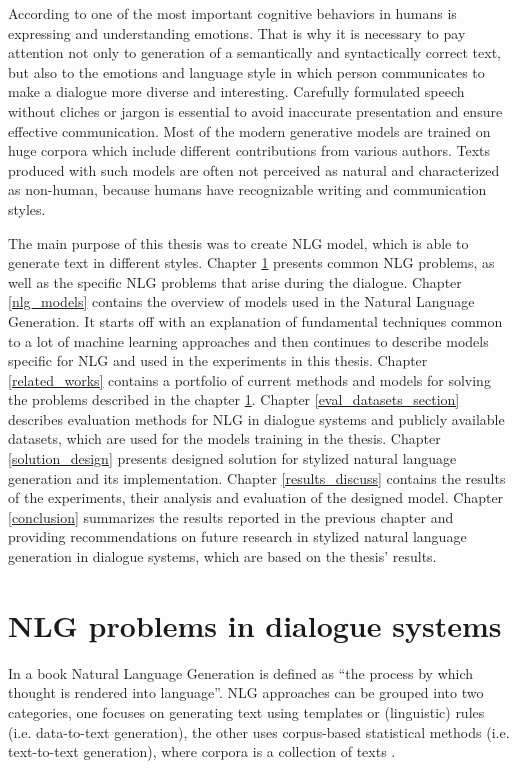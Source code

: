 According to \cite{salovey1990emotional} one of the most important cognitive behaviors in humans is expressing and understanding emotions. That is why it is necessary to pay attention not only to generation of a semantically and syntactically correct text, but also to the emotions and language style in which person communicates to make a dialogue more diverse and interesting. Carefully formulated speech without cliches or jargon is essential to avoid inaccurate presentation and ensure effective communication. Most of the modern generative models are trained on huge corpora which include different contributions from various authors. Texts produced with such models are often not perceived as natural and characterized as non-human, because humans have recognizable writing and communication styles.

The main purpose of this thesis was to create NLG model, which is able to generate text in different styles. Chapter \ref{nlg_problems} presents common NLG problems, as well as the specific NLG problems that arise during the dialogue. Chapter \ref{nlg_models} contains the overview of models used in the Natural Language Generation. It starts off with an explanation of fundamental techniques common to a lot of machine learning approaches and then continues to describe models specific for NLG and used in the experiments in this thesis. Chapter \ref{related_works} contains a portfolio of current methods and models for solving the problems described in the chapter \ref{nlg_problems}. Chapter \ref{eval_datasets_section} describes evaluation methods for NLG in dialogue systems and  publicly available datasets, which are used for the models training in the thesis. Chapter \ref{solution_design} presents designed solution for stylized natural language generation and its implementation. Chapter \ref{results_discuss} contains the results of the experiments, their analysis and evaluation of the designed model. Chapter \ref{conclusion} summarizes the results reported in the previous chapter and providing recommendations on future research in stylized natural language generation in dialogue systems, which are based on the thesis' results. 

\chapter{NLG problems in dialogue systems}\label{nlg_problems}
In a book \cite{alder2017handbook} Natural Language Generation is defined as ``the process by which thought is rendered into language''. NLG approaches can be grouped into two categories, one focuses on generating text using templates or (linguistic) rules (i.e. data-to-text generation), the other uses corpus-based statistical methods (i.e. text-to-text generation), where corpora is a collection of texts \cite{oh2002stochastic}.


